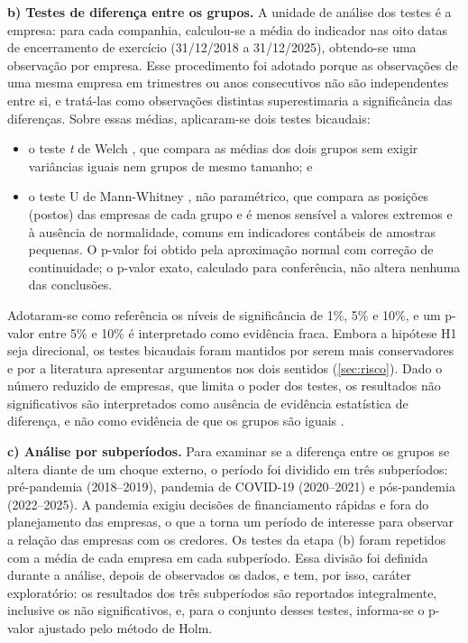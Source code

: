 \textbf{b) Testes de diferença entre os grupos.} A unidade de análise dos testes é
a empresa: para cada companhia, calculou-se a média do indicador nas oito datas de
encerramento de exercício (31/12/2018 a 31/12/2025), obtendo-se uma observação por
empresa. Esse procedimento foi adotado porque as observações de uma mesma empresa
em trimestres ou anos consecutivos não são independentes entre si, e tratá-las
como observações distintas superestimaria a significância das diferenças. Sobre
essas médias, aplicaram-se dois testes bicaudais:

\begin{itemize}
\item o teste \textit{t} de Welch \cite{welch1947}, que compara as médias dos dois
grupos sem exigir variâncias iguais nem grupos de mesmo tamanho; e
\item o teste U de Mann-Whitney \cite{mann1947}, não paramétrico, que compara as
posições (postos) das empresas de cada grupo e é menos sensível a valores
extremos e à ausência de normalidade, comuns em indicadores contábeis de amostras
pequenas. O p-valor foi obtido pela aproximação normal com correção de
continuidade; o p-valor exato, calculado para conferência, não altera nenhuma das
conclusões.
\end{itemize}

Adotaram-se como referência os níveis de significância de 1\%, 5\% e 10\%, e um
p-valor entre 5\% e 10\% é interpretado como evidência fraca. Embora a hipótese H1
seja direcional, os testes bicaudais foram mantidos por serem mais conservadores e
por a literatura apresentar argumentos nos dois sentidos (\autoref{sec:risco}).
Dado o número reduzido de empresas, que limita o poder dos testes, os resultados
não significativos são interpretados como ausência de evidência estatística de
diferença, e não como evidência de que os grupos são iguais
\cite{wasserstein2016}.

\textbf{c) Análise por subperíodos.} Para examinar se a diferença entre os grupos
se altera diante de um choque externo, o período foi dividido em três
subperíodos: pré-pandemia (2018--2019), pandemia de COVID-19 (2020--2021) e
pós-pandemia (2022--2025). A pandemia exigiu decisões de financiamento rápidas e
fora do planejamento das empresas, o que a torna um período de interesse para
observar a relação das empresas com os credores. Os testes da etapa (b) foram
repetidos com a média de cada empresa em cada subperíodo. Essa divisão foi definida
durante a análise, depois de observados os dados, e tem, por isso, caráter
exploratório: os resultados dos três subperíodos são reportados integralmente,
inclusive os não significativos, e, para o conjunto desses testes, informa-se o
p-valor ajustado pelo método de Holm.

